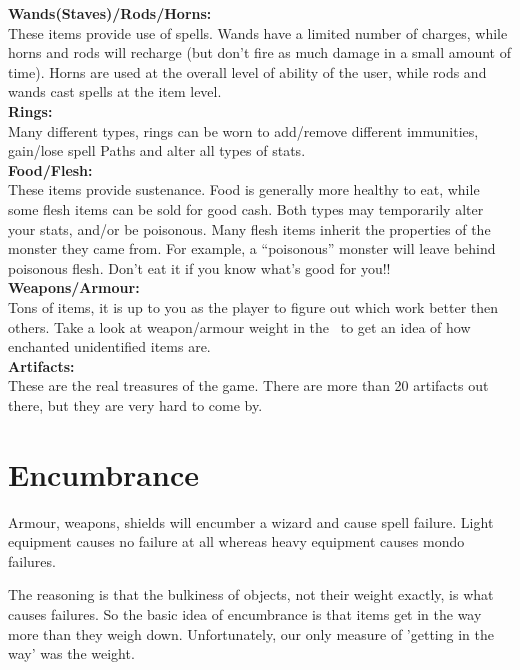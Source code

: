 {\bf Wands(Staves)/Rods/Horns:}
 \\
	These items provide use of spells. Wands have a limited
	number of charges, while horns and rods will recharge
	(but don't fire as much damage in a small amount of time).
	Horns are used at the overall level of ability of the
	user, while rods and wands cast spells at the item level.\\

{\bf Rings:} \\ 
     Many different types, rings can be worn to add/remove different
     immunities, gain/lose spell Paths and alter all types of stats. \\

{\bf Food/Flesh:} \\
	These items provide sustenance. Food is generally more healthy
	to eat, while some flesh items can be sold for good cash. Both
	types may temporarily alter your stats, and/or be poisonous.
	Many flesh items inherit the properties of the monster they
	came from. For example, a ``poisonous'' monster will leave
	behind poisonous flesh. Don't eat it if you know what's good
	for you!!\\

{\bf Weapons/Armour: }\\
     Tons of items, it is up to you as the player to figure out which work
     better then others. Take a look at weapon/armour weight in the \spoiler\
	to get an idea of how enchanted unidentified items are. \\

{\bf Artifacts:}\\
     These are the real treasures of the game. There are more than 20
     artifacts out there, but they are very hard to come by. \\

\section{Encumbrance}\label{sec:encumberance}
Armour, weapons, shields will encumber a wizard and cause spell
failure.  Light equipment causes no failure at all whereas heavy equipment
causes mondo failures.

The reasoning is that the bulkiness of objects, not their weight exactly, is
what causes failures. So the basic idea of encumbrance is that items get in the
way more than they weigh down. Unfortunately, our only measure of 'getting
in the way' was the weight.

